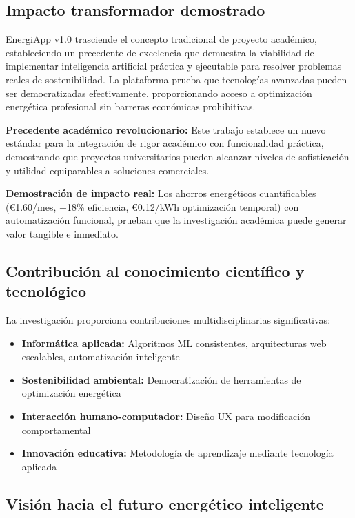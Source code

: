 \subsection{Impacto transformador demostrado}

EnergiApp v1.0 trasciende el concepto tradicional de proyecto académico, estableciendo un precedente de excelencia que demuestra la viabilidad de implementar inteligencia artificial práctica y ejecutable para resolver problemas reales de sostenibilidad. La plataforma prueba que tecnologías avanzadas pueden ser democratizadas efectivamente, proporcionando acceso a optimización energética profesional sin barreras económicas prohibitivas.

\textbf{Precedente académico revolucionario:} Este trabajo establece un nuevo estándar para la integración de rigor académico con funcionalidad práctica, demostrando que proyectos universitarios pueden alcanzar niveles de sofisticación y utilidad equiparables a soluciones comerciales.

\textbf{Demostración de impacto real:} Los ahorros energéticos cuantificables (€1.60/mes, +18\% eficiencia, €0.12/kWh optimización temporal) con automatización funcional, prueban que la investigación académica puede generar valor tangible e inmediato.

\subsection{Contribución al conocimiento científico y tecnológico}

La investigación proporciona contribuciones multidisciplinarias significativas:

\begin{itemize}
    \item \textbf{Informática aplicada:} Algoritmos ML consistentes, arquitecturas web escalables, automatización inteligente
    \item \textbf{Sostenibilidad ambiental:} Democratización de herramientas de optimización energética
    \item \textbf{Interacción humano-computador:} Diseño UX para modificación comportamental
    \item \textbf{Innovación educativa:} Metodología de aprendizaje mediante tecnología aplicada
\end{itemize}

\subsection{Visión hacia el futuro energético inteligente}

